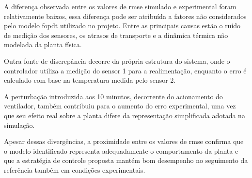 A diferença observada entre os valores de \gls{rmse} simulado e experimental
foram relativamente baixos, essa diferença pode ser atribuída a fatores
não considerados pelo modelo \gls{fopdt} utilizado no projeto. Entre as
principais causas estão o ruído de medição dos sensores, os atrasos de
transporte e a dinâmica térmica não modelada da planta física.

Outra fonte de discrepância decorre da própria estrutura do sistema, onde o
controlador utiliza a medição do sensor 1 para a realimentação, enquanto o erro
é calculado com base na temperatura medida pelo sensor 2.

A perturbação introduzida aos 10 minutos, decorrente do acionamento do
ventilador, também contribuiu para o aumento do erro experimental, uma vez que
seu efeito real sobre a planta difere da representação simplificada adotada na
simulação.

Apesar dessas divergências, a proximidade entre os valores de \gls{rmse}
confirma que o modelo identificado representa adequadamente o comportamento da
planta e que a estratégia de controle proposta mantém bom desempenho no
seguimento da referência também em condições experimentais.
